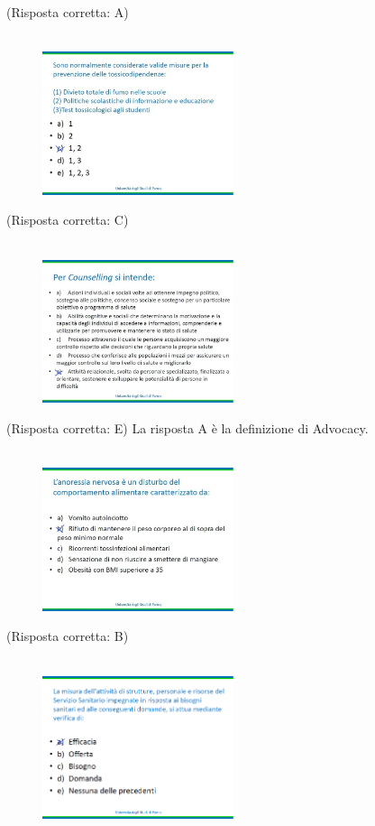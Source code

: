 (Risposta corretta: A)
\\\\
\begin{figure}[!ht]
\centering
	\includegraphics[width=0.5\textwidth]{25/image6.jpeg}
	\end{figure}

(Risposta corretta: C)
\\\\
\begin{figure}[!ht]
\centering
	\includegraphics[width=0.5\textwidth]{25/image7.jpeg}
	\end{figure}

(Risposta corretta: E) La risposta A è la definizione di Advocacy.
\\\\
\begin{figure}[!ht]
\centering
	\includegraphics[width=0.5\textwidth]{25/image8.jpeg}
	\end{figure}

(Risposta corretta: B)
\\\\
\begin{figure}[!ht]
\centering
	\includegraphics[width=0.5\textwidth]{25/image9.png}
	\end{figure}

